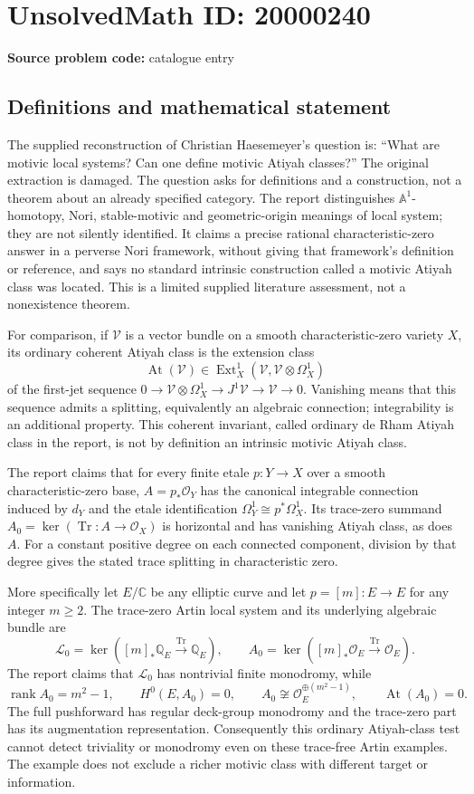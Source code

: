 \documentclass[11pt]{article}
\newcommand{\Q}{\mathbb{Q}}
\newcommand{\C}{\mathbb{C}}
\newcommand{\A}{\mathbb{A}}
\begin{document}
\section*{UnsolvedMath ID: 20000240}
\textbf{Source problem code:} catalogue entry
\subsection{Definitions and mathematical statement}
The supplied reconstruction of Christian Haesemeyer's question is: ``What are motivic local systems? Can one define motivic Atiyah classes?'' The original extraction is damaged. The question asks for definitions and a construction, not a theorem about an already specified category. The report distinguishes $\A^1$-homotopy, Nori, stable-motivic and geometric-origin meanings of local system; they are not silently identified. It claims a precise rational characteristic-zero answer in a perverse Nori framework, without giving that framework's definition or reference, and says no standard intrinsic construction called a motivic Atiyah class was located. This is a limited supplied literature assessment, not a nonexistence theorem.

For comparison, if $\mathcal V$ is a vector bundle on a smooth characteristic-zero variety $X$, its ordinary coherent Atiyah class is the extension class
\[
 \operatorname{At}(\mathcal V)\in
 \operatorname{Ext}^1_X(\mathcal V,\mathcal V\otimes\Omega_X^1)
\]
of the first-jet sequence $0\to\mathcal V\otimes\Omega_X^1\to J^1\mathcal V\to\mathcal V\to0$. Vanishing means that this sequence admits a splitting, equivalently an algebraic connection; integrability is an additional property. This coherent invariant, called ordinary de Rham Atiyah class in the report, is not by definition an intrinsic motivic Atiyah class.

The report claims that for every finite etale $p:Y\to X$ over a smooth characteristic-zero base, $A=p_*\mathcal O_Y$ has the canonical integrable connection induced by $d_Y$ and the etale identification $\Omega_Y^1\cong p^*\Omega_X^1$. Its trace-zero summand $A_0=\ker(\operatorname{Tr}:A\to\mathcal O_X)$ is horizontal and has vanishing Atiyah class, as does $A$. For a constant positive degree on each connected component, division by that degree gives the stated trace splitting in characteristic zero.

More specifically let $E/\C$ be any elliptic curve and let $p=[m]:E\to E$ for any integer $m\geq2$. The trace-zero Artin local system and its underlying algebraic bundle are
\[
 \mathcal L_0=\ker([m]_*\Q_E\xrightarrow{\operatorname{Tr}}\Q_E),\qquad
 A_0=\ker([m]_*\mathcal O_E\xrightarrow{\operatorname{Tr}}\mathcal O_E).
\]
The report claims that $\mathcal L_0$ has nontrivial finite monodromy, while
\[
 \operatorname{rank} A_0=m^2-1,\qquad H^0(E,A_0)=0,\qquad
 A_0\not\cong\mathcal O_E^{\oplus(m^2-1)},\qquad\operatorname{At}(A_0)=0.
\]
The full pushforward has regular deck-group monodromy and the trace-zero part has its augmentation representation. Consequently this ordinary Atiyah-class test cannot detect triviality or monodromy even on these trace-free Artin examples. The example does not exclude a richer motivic class with different target or information.
\end{document}
